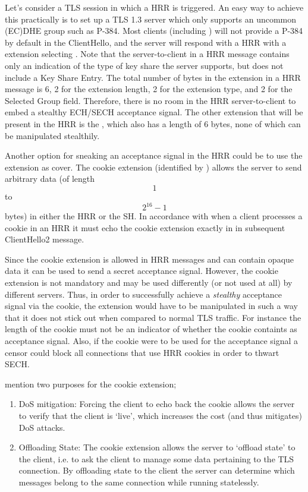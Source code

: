 Let's consider a TLS session in which a HRR is triggered. An easy way to achieve this practically is to set up a TLS 1.3 server which only supports an uncommon (EC)DHE group such as P-384. Most clients (including ) will not provide a P-384  by default in the ClientHello, and the server will respond with a HRR with a  extension selecting . Note that the server-to-client  in a HRR message contains only an indication of the type of key share the server supports, but does not include a Key Share Entry. The total number of bytes in the  extension in a HRR message is 6, 2 for the extension length, 2 for the extension type, and 2 for the Selected Group field. Therefore, there is no room in the HRR server-to-client  to embed a stealthy ECH/SECH acceptance signal. The other extension that will be present in the HRR is the , which also has a length of 6 bytes, none of which can be manipulated stealthily.

Another option for sneaking an acceptance signal in the HRR could be to use the  extension as cover. The cookie extension (identified by ) allows the server to send arbitrary data (of length \[1\] to \[2^{16}-1\] bytes) in either the HRR or the SH. In accordance with  when a client processes a cookie in an HRR it must echo the cookie extension exactly in in subsequent ClientHello2 message.

Since the cookie extension is allowed in HRR messages and can contain opaque data it can be used to send a secret acceptance signal. However, the cookie extension is not mandatory and may be used differently (or not used at all) by different servers. Thus, in order to successfully achieve a {\em stealthy} acceptance signal via the cookie, the extension would have to be manipulated in such a way that it does not stick out  when compared to normal TLS traffic. For instance the length of the cookie must not be an indicator of whether the cookie containts as acceptance signal. Also, if the cookie were to be used for the acceptance signal a censor could block all connections that use HRR cookies in order to thwart SECH.

 mention two purposes for the cookie extension;
\begin{enumerate}
    \item DoS mitigation: Forcing the client to echo back the cookie allows the server to verify that the client is `live', which increases the cost (and thus mitigates) DoS attacks.
    \item Offloading State: The cookie extension allows the server to `offload state' to the client, i.e. to ask the client to manage some data pertaining to the TLS connection. By offloading state to the client the server can determine which messages belong to the same connection while running statelessly.
\end{enumerate}

